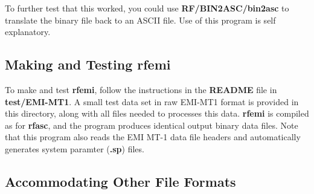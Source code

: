 To further test that this worked, you could use {\bf RF/BIN2ASC/bin2asc}
to translate the binary file back to an ASCII file.  Use of
this program is self explanatory.

\subsection{Making and Testing rfemi}

To make and test {\bf rfemi}, follow the instructions in the
{\bf README} file in {\bf test/EMI-MT1}.  A small test data
set in raw EMI-MT1 format is provided in this directory,
along with all files needed to processes this data.  {\bf rfemi}
is compiled as for {\bf rfasc}, and the program produces
identical output binary data files.  Note that this program also
reads the EMI MT-1 data file headers and automatically generates
system paramter ({\bf *.sp}) files.

\subsection{Accommodating Other File Formats}

